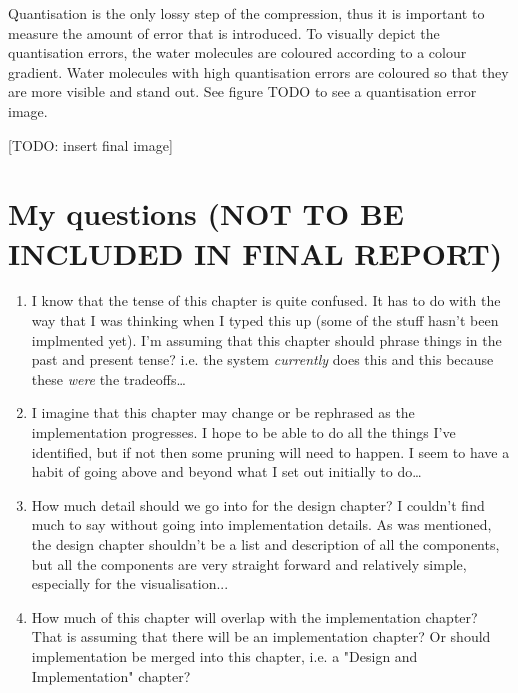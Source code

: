 Quantisation is the only lossy step of the compression, thus it is important to
measure the amount of error that is introduced. To visually depict the
quantisation errors, the water molecules are coloured according to a colour
gradient. Water molecules with high quantisation errors are coloured so that
they are more visible and stand out. See figure TODO to see a quantisation
error image.

[TODO: insert final image]





\newpage
\section{My questions (NOT TO BE INCLUDED IN FINAL REPORT)}

\begin{enumerate}

  \item
  I know that the tense of this chapter is quite confused. It has to do
  with the way that I was thinking when I typed this up (some of the stuff
  hasn't been implmented yet). I'm assuming that this chapter should phrase
  things in the past and present tense? i.e. the system \emph{currently} does
  this and this because these \emph{were} the tradeoffs\dots

  \item
  I imagine that this chapter may change or be rephrased as the implementation
  progresses. I hope to be able to do all the things I've identified, but if
  not then some pruning will need to happen. I seem to have a habit of going
  above and beyond what I set out initially to do\dots

  \item
  How much detail should we go into for the design chapter? I couldn't find
  much to say without going into implementation details.  As was mentioned, the
  design chapter shouldn't be a list and description of all the components, but
  all the components are very straight forward and relatively simple,
  especially for the visualisation...

  \item
  How much of this chapter will overlap with the implementation chapter?
  That is assuming that there will be an implementation chapter? Or should
  implementation be merged into this chapter, i.e. a "Design and
  Implementation" chapter?

\end{enumerate}

